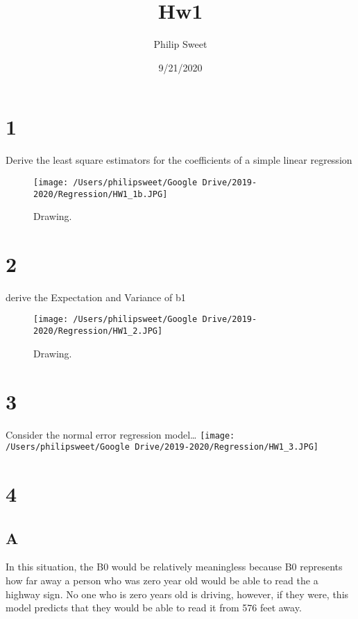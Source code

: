 \documentclass[]{article}
\title{Hw1}
\author{Philip Sweet}
\date{9/21/2020}
\begin{document}
\maketitle

\hypertarget{section}{%
\section{\texorpdfstring{\textbf{1}}{1}}\label{section}}

Derive the least square estimators for the coefficients of a simple
linear regression

\begin{figure}
\centering
\texttt{[image: /Users/philipsweet/Google Drive/2019-2020/Regression/HW1\_1b.JPG]}
\caption{Drawing.}
\end{figure}

\hypertarget{section-1}{%
\section{\texorpdfstring{\textbf{2}}{2}}\label{section-1}}

derive the Expectation and Variance of b1

\begin{figure}
\centering
\texttt{[image: /Users/philipsweet/Google Drive/2019-2020/Regression/HW1\_2.JPG]}
\caption{Drawing.}
\end{figure}

\hypertarget{section-2}{%
\section{\texorpdfstring{\textbf{3}}{3}}\label{section-2}}

Consider the normal error regression model\ldots{}
\texttt{[image: /Users/philipsweet/Google Drive/2019-2020/Regression/HW1\_3.JPG]}

\hypertarget{section-3}{%
\section{\texorpdfstring{\textbf{4}}{4}}\label{section-3}}

\hypertarget{a}{%
\subsection{A}\label{a}}

In this situation, the B0 would be relatively meaningless because B0
represents how far away a person who was zero year old would be able to
read the a highway sign. No one who is zero years old is driving,
however, if they were, this model predicts that they would be able to
read it from 576 feet away.
\end{document}

